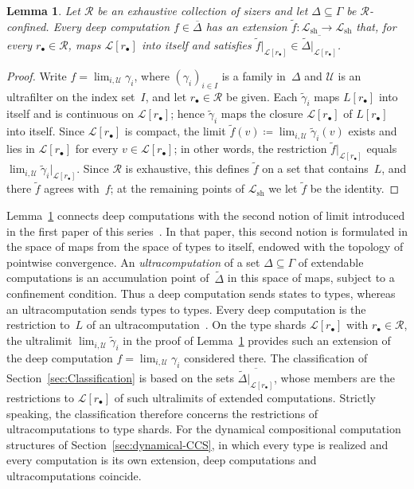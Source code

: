 \documentclass[psamsfonts]{amsart}
\newtheorem{lem}[thm]{Lemma}
\theoremstyle{definition}
\theoremstyle{remark}
\newcommand{\Lshard}{\mathcal{L}_{\mathrm{sh}}}
\newcommand{\rb}{r_{\bullet}}
\numberwithin{equation}{section}
\begin{document}
\begin{lem}\label{lem:extension}
  Let $\mathscr{R}$ be an exhaustive collection of sizers and let $\Delta\subseteq\Gamma$ be $\mathscr{R}$-confined.
  Every deep computation $f\in\overline{\Delta}$ has an extension $\tilde f:\Lshard\to\Lshard$ that, for every $\rb\in \mathscr{R}$, maps $\mathcal{L}[\rb]$ into itself and satisfies $\tilde f|_{\mathcal{L}[\rb]}\in\overline{\tilde\Delta|_{\mathcal{L}[\rb]}}$.
\end{lem}
\begin{proof}
  Write $f=\lim_{i,\mathcal{U}}\gamma_i$, where $(\gamma_i)_{i\in I}$ is a family in~$\Delta$ and $\mathcal{U}$ is an ultrafilter on the index set~$I$, and let $\rb\in \mathscr{R}$ be given.
  Each $\tilde\gamma_i$ maps $L[\rb]$ into itself and is continuous on $\mathcal{L}[\rb]$;
  hence $\tilde\gamma_i$ maps the closure $\mathcal{L}[\rb]$ of $L[\rb]$ into itself.
  Since $\mathcal{L}[\rb]$ is compact, the limit $\tilde f(v)\coloneqq\lim_{i,\mathcal{U}}\tilde\gamma_i(v)$ exists and lies in $\mathcal{L}[\rb]$ for every $v\in\mathcal{L}[\rb]$;
  in other words, the restriction $\tilde f|_{\mathcal{L}[\rb]}$ equals $\lim_{i,\mathcal{U}}\tilde\gamma_i|_{\mathcal{L}[\rb]}$.
  Since $\mathscr{R}$ is exhaustive, this defines $\tilde f$ on a set that contains~$L$, and there $\tilde f$ agrees with~$f$;
  at the remaining points of $\Lshard$ we let $\tilde f$ be the identity.
\end{proof}

Lemma~\ref{lem:extension} connects deep computations with the second notion of limit introduced in the first paper of this series~\cite{alva2024approximability}.
In that paper, this second notion is formulated in the space of maps from the space of types to itself, endowed with the topology of pointwise convergence.
An \emph{ultracomputation} of a set $\Delta\subseteq\Gamma$ of extendable computations is an accumulation point of~$\tilde\Delta$ in this space of maps, subject to a confinement condition.
Thus a deep computation sends states to types, whereas an ultracomputation sends types to types.
Every deep computation is the restriction to~$L$ of an ultracomputation~\cite{alva2024approximability}.
On the type shards $\mathcal{L}[\rb]$ with $\rb\in\mathscr{R}$, the ultralimit $\lim_{i,\mathcal{U}}\tilde\gamma_i$ in the proof of Lemma~\ref{lem:extension} provides such an extension of the deep computation $f=\lim_{i,\mathcal{U}}\gamma_i$ considered there.
The classification of Section~\ref{sec:Classification} is based on the sets $\overline{\tilde\Delta|_{\mathcal{L}[\rb]}}$, whose members are the restrictions to $\mathcal{L}[\rb]$ of such ultralimits of extended computations.
Strictly speaking, the classification therefore concerns the restrictions of ultracomputations to type shards.
For the dynamical compositional computation structures of Section~\ref{sec:dynamical-CCS}, in which every type is realized and every computation is its own extension, deep computations and ultracomputations coincide.
\end{document}
